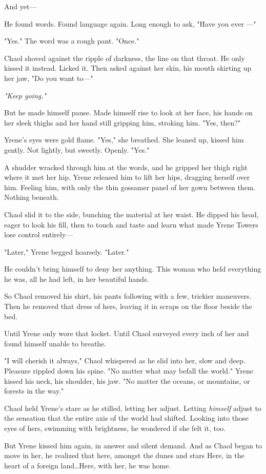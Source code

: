 And yet---

He found words.
Found language again.
Long enough to ask, "Have you ever ---"

"Yes."
The word was a rough pant.
"Once."

Chaol shoved against the ripple of darkness, the line on that throat.
He only kissed it instead.
Licked it.
Then asked against her skin, his mouth skirting up her jaw, "Do you want to---"

\emph{"Keep going."}

But he made himself pause.
Made himself rise to look at her face, his hands on her sleek thighs and her hand still gripping him, stroking him.
"Yes, then?"

Yrene's eyes were gold flame.
"Yes," she breathed.
She leaned up, kissed him gently.
Not lightly, but sweetly.
Openly.
"Yes."

A shudder wracked through him at the words, and he gripped her thigh right where it met her hip.
Yrene released him to lift her hips, dragging herself over him.
Feeling him, with only the thin gossamer panel of her gown between them.
Nothing beneath.

Chaol slid it to the side, bunching the material at her waist.
He dipped his head, eager to look his fill, then to touch and taste and learn what made Yrene Towers lose control entirely---

"Later," Yrene begged hoarsely.
"Later."

He couldn't bring himself to deny her anything.
This woman who held everything he was, all he had left, in her beautiful hands.

So Chaol removed his shirt, his pants following with a few, trickier maneuvers.
Then he removed that dress of hers, leaving it in scraps on the floor beside the bed.

Until Yrene only wore that locket.
Until Chaol surveyed every inch of her and found himself unable to breathe.

"I will cherish it always," Chaol whispered as he slid into her, slow and deep.
Pleasure rippled down his spine.
"No matter what may befall the world."
Yrene kissed his neck, his shoulder, his jaw.
"No matter the oceans, or mountains, or forests in the way."

Chaol held Yrene's stare as he stilled, letting her adjust.
Letting \emph{himself} adjust to the sensation that the entire axis of the world had shifted.
Looking into those eyes of hers, swimming with brightness, he wondered if she felt it, too.

But Yrene kissed him again, in answer and silent demand.
And as Chaol began to move in her, he realized that here, amongst the dunes and stars  Here, in the heart of a foreign land\ldots Here, with her, he was home.

